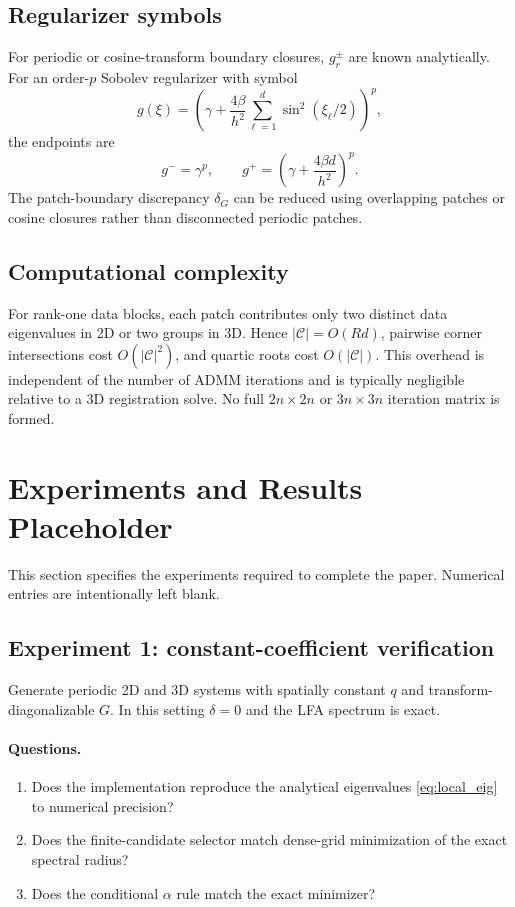 \documentclass[11pt]{article}
\theoremstyle{definition}
\begin{document}
\subsection{Regularizer symbols}
For periodic or cosine-transform boundary closures, $g_r^\pm$ are known analytically. For an order-$p$ Sobolev regularizer with symbol
\[
g(\xi)=\left(\gamma+\frac{4\beta}{h^2}\sum_{\ell=1}^d\sin^2(\xi_\ell/2)\right)^p,
\]
the endpoints are
\[
g^- = \gamma^p,
\qquad
g^+=\left(\gamma+\frac{4\beta d}{h^2}\right)^p.
\]
The patch-boundary discrepancy $\delta_G$ can be reduced using overlapping patches or cosine closures rather than disconnected periodic patches.

\subsection{Computational complexity}
For rank-one data blocks, each patch contributes only two distinct data eigenvalues in 2D or two groups in 3D. Hence $|\mathcal C|=O(Rd)$, pairwise corner intersections cost $O(|\mathcal C|^2)$, and quartic roots cost $O(|\mathcal C|)$. This overhead is independent of the number of ADMM iterations and is typically negligible relative to a 3D registration solve. No full $2n\times2n$ or $3n\times3n$ iteration matrix is formed.

\section{Experiments and Results Placeholder}
This section specifies the experiments required to complete the paper. Numerical entries are intentionally left blank.

\subsection{Experiment 1: constant-coefficient verification}
Generate periodic 2D and 3D systems with spatially constant $q$ and transform-diagonalizable $G$. In this setting $\delta=0$ and the LFA spectrum is exact.

\paragraph{Questions.}
\begin{enumerate}[leftmargin=2em]
\item Does the implementation reproduce the analytical eigenvalues \eqref{eq:local_eig} to numerical precision?
\item Does the finite-candidate selector match dense-grid minimization of the exact spectral radius?
\item Does the conditional $\alpha$ rule match the exact minimizer?
\end{enumerate}
\end{document}
